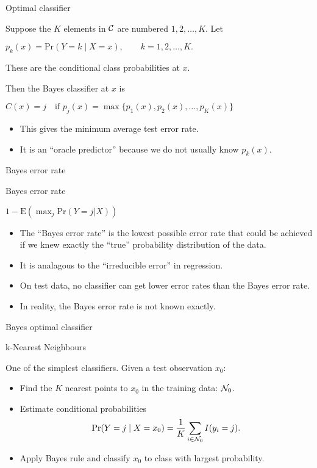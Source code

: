 \documentclass[14pt]{beamer}
\begin{document}
\begin{frame}{Optimal classifier}

Suppose the $K$ elements in $\cal C$ are
numbered $1, 2, \dots, K$. Let
\begin{block}{}
\centerline{$
p_k(x) = \text{Pr}(Y = k\mid X = x),\qquad k = 1, 2, \dots , K.
$}
\end{block}
These are the \alert{conditional class probabilities} at $x$. \pause


Then the \alert{Bayes} classifier at $x$ is
\begin{block}{}
\centerline{$
C(x) = j\quad \text{if $p_j(x) = \max\{p_1(x), p_2(x), \dots, p_K(x)\}$}
$}
\end{block}\pause

\begin{itemize}
\item 
This gives the minimum average test error rate. 
\item It is an ``oracle predictor'' because we do not usually know $p_k(x)$.
\end{itemize}
\end{frame}

\begin{frame}{Bayes error rate}
\begin{block}{Bayes error rate}
\centerline{$1-\text{E}\left(\max_j \text{Pr}(Y=j | X)\right)$}
\end{block}
\begin{itemize}
\item The ``Bayes error rate'' is the lowest possible error rate that could be achieved if we knew exactly the ``true'' probability distribution of the data.
\item It is analagous to the ``irreducible error'' in regression.
\item On test data, no classifier can get lower error rates than the Bayes error rate.
\item In reality, the Bayes error rate is not known exactly.
\end{itemize}
\end{frame}

\begin{frame}{Bayes optimal classifier}
\end{frame}

\begin{frame}{k-Nearest Neighbours}

One of the simplest classifiers. Given a test observation $x_0$:
\begin{itemize}
\item Find the $K$ nearest points to $x_0$ in the training data: ${\cal N}_0$.
\item Estimate conditional probabilities
$$\text{Pr}(Y=j \mid X=x_0) = \frac{1}{K}\sum_{i\in {\cal N}_0} I(y_i = j).$$
\item Apply Bayes rule and classify $x_0$ to class with largest probability.
\end{itemize}
\end{frame}
\end{document}
